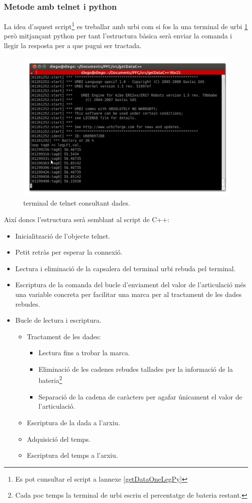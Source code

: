 \documentclass[12pt,a4paper,final,twoside]{article}
\begin{document}
\subsubsection{Metode amb telnet i python}
La idea d'aquest script\footnote{Es pot cunsultar el script a lannexe \ref{getDataOneLegPy}} es treballar amb urbi com si fos la una terminal de urbi \ref{fig:telnet} però mitjançant python per tant l'estructura bàsica serà enviar la comanda i llegir la resposta per a que pugui ser tractada. 
\begin{figure}[h!]
	\centering
    \includegraphics[scale=0.65]{images/telnet.pdf}
	 \caption{terminal de telnet consultant dades.}
  \label{fig:telnet}
\end{figure}
Així doncs l'estructura serà semblant al script de C++:
\begin{itemize}
\item Inicialització de l'objecte telnet.
\item Petit retràs per esperar la connexió.
\item Lectura i eliminació de la capsalera del terminal urbi rebuda pel terminal.
\item Escriptura de la comanda del bucle d'enviament del valor de l'articulació més una variable concreta per facilitar una marca per al tractament de les dades rebudes.
\item Bucle de lectura i escriptura.
\begin{itemize}
\item Tractament de les dades:
\begin{itemize}
\item Lectura fins a trobar la marca.
\item Eliminació de les cadenes rebudes tallades per la informació de la bateria\footnote{Cada poc temps la terminal de urbi escriu el percentatge de bateria restant.}
\item Separació de la cadena de caràcters per agafar únicament el valor de l'articulació.
\
\end{itemize}
\item Escriptura de la dada a l'arxiu.
\item Adquisició del temps.
\item Escriptura del temps a l'arxiu.
\end{itemize} 
\end{itemize}
\end{document}
